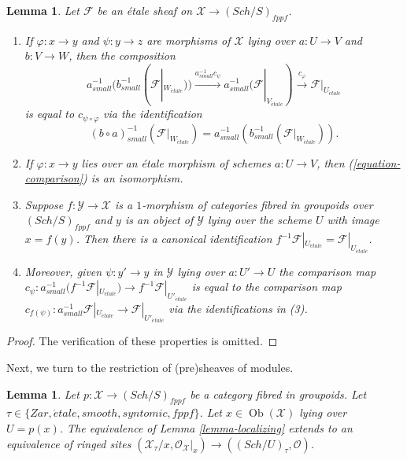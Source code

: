 \documentclass{stacks-project}
\theoremstyle{plain}
\newtheorem{lemma}[subsection]{Lemma}
\theoremstyle{definition}
\theoremstyle{remark}
\numberwithin{equation}{subsection}
\def\Sch{\mathit{Sch}}
\def\Ob{\mathop{\mathrm{Ob}}\nolimits}
\def\etale{{\acute{e}tale}}
\begin{document}
\begin{lemma}
\label{lemma-comparison}
Let $\mathcal{F}$ be an \'etale sheaf on $\mathcal{X} \to (\Sch/S)_{fppf}$.
\begin{enumerate}
\item If $\varphi : x \to y$ and $\psi : y \to z$
are morphisms of $\mathcal{X}$ lying over $a : U \to V$ and
$b : V \to W$, then the composition
$$
a_{small}^{-1}(b_{small}^{-1} (\mathcal{F}|_{W_\etale}))
\xrightarrow{a_{small}^{-1}c_\psi}
a_{small}^{-1}(\mathcal{F}|_{V_\etale})
\xrightarrow{c_\varphi}
\mathcal{F}|_{U_\etale}
$$
is equal to $c_{\psi \circ \varphi}$ via the identification
$$
(b \circ a)_{small}^{-1}(\mathcal{F}|_{W_\etale}) =
a_{small}^{-1}(b_{small}^{-1} (\mathcal{F}|_{W_\etale})).
$$
\item If $\varphi : x \to y$ lies over an \'etale morphism of schemes
$a : U \to V$, then (\ref{equation-comparison}) is an isomorphism.
\item Suppose $f : \mathcal{Y} \to \mathcal{X}$ is a $1$-morphism of
categories fibred in groupoids over $(\Sch/S)_{fppf}$ and $y$ is
an object of $\mathcal{Y}$ lying over the scheme $U$ with image
$x = f(y)$. Then there is a canonical identification
$f^{-1}\mathcal{F}|_{U_\etale} = \mathcal{F}|_{U_\etale}$.
\item Moreover, given $\psi : y' \to y$ in $\mathcal{Y}$ lying over
$a : U' \to U$ the comparison map
$c_\psi : a_{small}^{-1}(f^{-1}\mathcal{F}|_{U_\etale}) \to
f^{-1}\mathcal{F}|_{U'_\etale}$ is equal to the
comparison map $c_{f(\psi)} : a_{small}^{-1}\mathcal{F}|_{U_\etale}
\to \mathcal{F}|_{U'_\etale}$ via the identifications in (3).
\end{enumerate}
\end{lemma}

\begin{proof}
The verification of these properties is omitted.
\end{proof}

\noindent
Next, we turn to the restriction of (pre)sheaves of modules.

\begin{lemma}
\label{lemma-localizing-structure-sheaf}
Let $p : \mathcal{X} \to (\Sch/S)_{fppf}$ be a category fibred
in groupoids. Let $\tau \in \{Zar, \etale, smooth, syntomic, fppf\}$.
Let $x \in \Ob(\mathcal{X})$ lying over $U = p(x)$.
The equivalence of
Lemma \ref{lemma-localizing}
extends to an equivalence of ringed sites
$(\mathcal{X}_\tau/x, \mathcal{O}_\mathcal{X}|_x) \to
((\Sch/U)_\tau, \mathcal{O})$.
\end{lemma}
\end{document}
